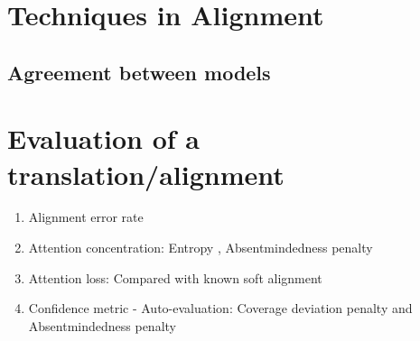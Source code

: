 \documentclass{article}
\begin{document}
\section{Techniques in Alignment}

\subsection{Agreement between models}

\section{Evaluation of a translation/alignment}
\begin{enumerate}
\item Alignment error rate
\item Attention concentration: Entropy \citep{Ghader2017what}, Absentmindedness penalty \citep{Rikters2017confidence}
\item Attention loss: Compared with known soft alignment
\item Confidence metric - Auto-evaluation: Coverage deviation penalty and Absentmindedness penalty \citep{Rikters2017confidence}

\end{enumerate}


\pagebreak 



\end{document}
